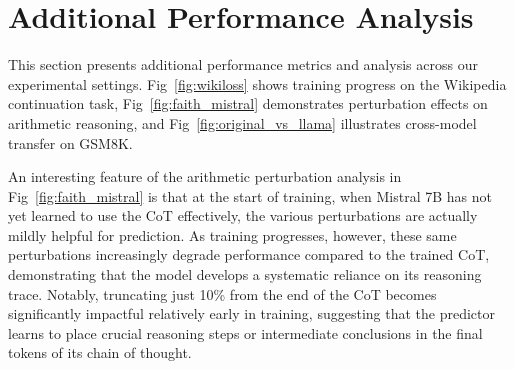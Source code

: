 \documentclass{article}
\begin{document}
\newpage
\appendix
\onecolumn
\section{Additional Performance Analysis}
This section presents additional performance metrics and analysis across our experimental settings. Fig~\ref{fig:wikiloss} shows training progress on the Wikipedia continuation task, Fig~\ref{fig:faith_mistral} demonstrates perturbation effects on arithmetic reasoning, and Fig~\ref{fig:original_vs_llama} illustrates cross-model transfer on GSM8K.

An interesting feature of the arithmetic perturbation analysis in Fig~\ref{fig:faith_mistral} is that at the start of training, when Mistral 7B has not yet learned to use the CoT effectively, the various perturbations are actually mildly helpful for prediction. As training progresses, however, these same perturbations increasingly degrade performance compared to the trained CoT, demonstrating that the model develops a systematic reliance on its reasoning trace. Notably, truncating just 10\% from the end of the CoT becomes significantly impactful relatively early in training, suggesting that the predictor learns to place crucial reasoning steps or intermediate conclusions in the final tokens of its chain of thought.
\end{document}
